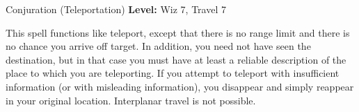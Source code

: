 {Conjuration (Teleportation)}
{
	\textbf{Level:}
	Wiz 7, Travel 7\\
}
{
	This spell functions like teleport, except that there is no range limit and there is no chance you arrive off target. In addition, you need not have seen the destination, but in that case you must have at least a reliable description of the place to which you are teleporting. If you attempt to teleport with insufficient information (or with misleading information), you disappear and simply reappear in your original location. Interplanar travel is not possible.

}
